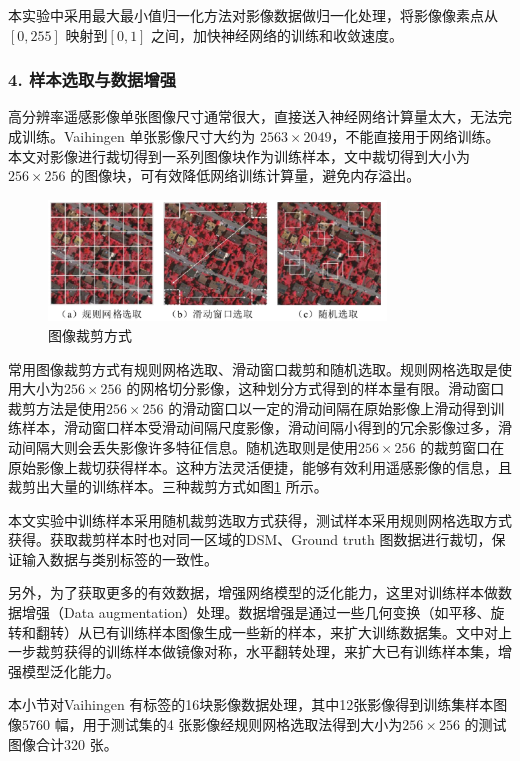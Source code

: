 本实验中采用最大最小值归一化方法对影像数据做归一化处理，将影像像素点从$[0,255]$ 映射到$[0,1]$ 之间，加快神经网络的训练和收敛速度。

\subsubsection*{4. 样本选取与数据增强}
高分辨率遥感影像单张图像尺寸通常很大，直接送入神经网络计算量太大，无法完成训练。Vaihingen 单张影像尺寸大约为 $2563 \times 2049$，不能直接用于网络训练。本文对影像进行裁切得到一系列图像块作为训练样本，文中裁切得到大小为$256 \times 256$ 的图像块，可有效降低网络训练计算量，避免内存溢出。

\begin{figure}[htb]
  \centering
  \includegraphics[width=0.8\textwidth]{figures/sample_data}
  \caption{图像裁剪方式}\label{fig:sample_data}
\end{figure}

常用图像裁剪方式有规则网格选取、滑动窗口裁剪和随机选取。规则网格选取是使用大小为$256 \times 256$ 的网格切分影像，这种划分方式得到的样本量有限。滑动窗口裁剪方法是使用$256 \times 256$ 的滑动窗口以一定的滑动间隔在原始影像上滑动得到训练样本，滑动窗口样本受滑动间隔尺度影像，滑动间隔小得到的冗余影像过多，滑动间隔大则会丢失影像许多特征信息。随机选取则是使用$256 \times 256$ 的裁剪窗口在原始影像上裁切获得样本。这种方法灵活便捷，能够有效利用遥感影像的信息，且裁剪出大量的训练样本。三种裁剪方式如图\ref{fig:sample_data} 所示。

本文实验中训练样本采用随机裁剪选取方式获得，测试样本采用规则网格选取方式获得。获取裁剪样本时也对同一区域的DSM、Ground truth 图数据进行裁切，保证输入数据与类别标签的一致性。

另外，为了获取更多的有效数据，增强网络模型的泛化能力，这里对训练样本做数据增强（Data augmentation）处理。数据增强是通过一些几何变换（如平移、旋转和翻转）从已有训练样本图像生成一些新的样本，来扩大训练数据集。文中对上一步裁剪获得的训练样本做镜像对称，水平翻转处理，来扩大已有训练样本集，增强模型泛化能力。

本小节对Vaihingen 有标签的16块影像数据处理，其中12张影像得到训练集样本图像$5760$ 幅，用于测试集的4 张影像经规则网格选取法得到大小为$256 \times 256$ 的测试图像合计$320$ 张。

